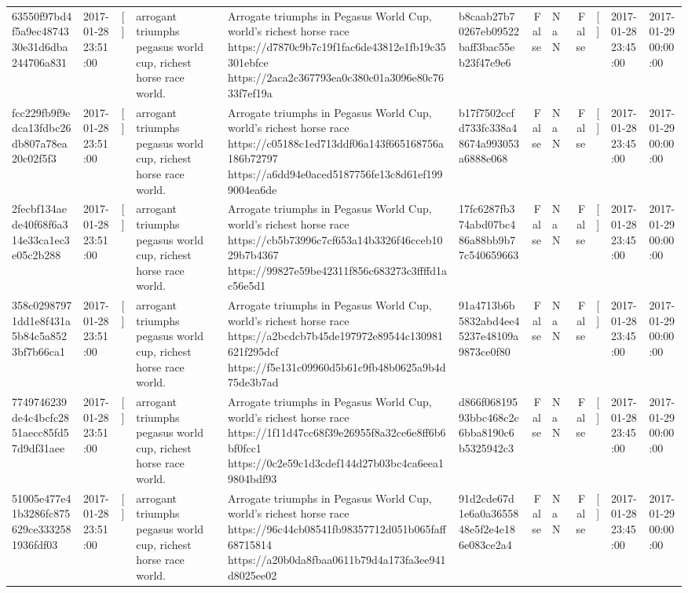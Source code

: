 \begin{tabular}{llllllrlrlll}
63550f97bd4f5a9ec4874330e31d6dba244706a831 & 2017-01-28 23:51:00 & [] & arrogant triumphs pegasus world cup, richest horse race world. & Arrogate triumphs in Pegasus World Cup, world's richest horse race https://d7870c9b7c19f1fac6de43812e1fb19c35301ebfce https://2aca2c367793ea0c380c01a3096e80c7633f7ef19a & b8caab27b70267eb09522baff3bac55eb23f47e9e6 & False & NaN & False & [] & 2017-01-28 23:45:00 & 2017-01-29 00:00:00 \\
fcc229fb9f9edca13fdbc26db807a78ea20c02f5f3 & 2017-01-28 23:51:00 & [] & arrogant triumphs pegasus world cup, richest horse race world. & Arrogate triumphs in Pegasus World Cup, world's richest horse race https://c05188c1ed713ddf06a143f665168756a186b72797 https://a6dd94e0aced5187756fe13c8d61ef1999004ea6de & b17f7502ccfd733fc338a48674a993053a6888e068 & False & NaN & False & [] & 2017-01-28 23:45:00 & 2017-01-29 00:00:00 \\
2fecbf134aede40f68f6a314e33ca1ec3e05c2b288 & 2017-01-28 23:51:00 & [] & arrogant triumphs pegasus world cup, richest horse race world. & Arrogate triumphs in Pegasus World Cup, world's richest horse race https://cb5b73996c7cf653a14b3326f46cceb1029b7b4367 https://99827e59be42311f856c683273c3ffffd1ac56e5d1 & 17fc6287fb374abd07bc486a88bb9b77c540659663 & False & NaN & False & [] & 2017-01-28 23:45:00 & 2017-01-29 00:00:00 \\
358c02987971dd1e8f431a5b84c5a8523bf7b66ca1 & 2017-01-28 23:51:00 & [] & arrogant triumphs pegasus world cup, richest horse race world. & Arrogate triumphs in Pegasus World Cup, world's richest horse race https://a2bcdcb7b45de197972e89544c130981621f295dcf https://f5e131c09960d5b61c9fb48b0625a9b4d75de3b7ad & 91a4713b6b5832abd4ee45237e48109a9873ce0f80 & False & NaN & False & [] & 2017-01-28 23:45:00 & 2017-01-29 00:00:00 \\
7749746239de4c4bcfc2851aecc85fd57d9df31aee & 2017-01-28 23:51:00 & [] & arrogant triumphs pegasus world cup, richest horse race world. & Arrogate triumphs in Pegasus World Cup, world's richest horse race https://1f11d47cc68f39e26955f8a32ce6e8ff6b6bf0fcc1 https://0c2e59c1d3cdef144d27b03bc4ca6eea19804bdf93 & d866f06819593bbc468c2c6bba8190c6b5325942c3 & False & NaN & False & [] & 2017-01-28 23:45:00 & 2017-01-29 00:00:00 \\
51005e477e41b3286fc875629ce3332581936fdf03 & 2017-01-28 23:51:00 & [] & arrogant triumphs pegasus world cup, richest horse race world. & Arrogate triumphs in Pegasus World Cup, world's richest horse race https://96c44cb08541fb98357712d051b065faff68715814 https://a20b0da8fbaa0611b79d4a173fa3ee941d8025ee02 & 91d2cde67d1e6a0a3655848e5f2e4e186e083ce2a4 & False & NaN & False & [] & 2017-01-28 23:45:00 & 2017-01-29 00:00:00 \\

\end{tabular}
